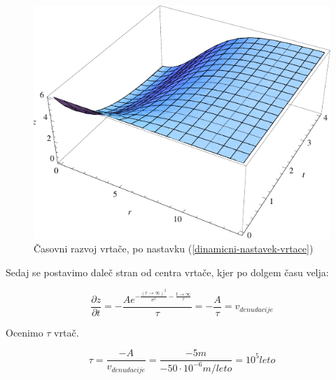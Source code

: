 \documentclass[a4paper, oneside, 12pt]{book}
\begin{document}
  \begin{figure}[H]
    \begin{center}
      \includegraphics[width=14cm]{slike/vrtaca-dinamicno}
    \end{center}
    \caption{Časovni razvoj vrtače, po nastavku (\ref{dinamicni-nastavek-vrtace})}
    \label{fig:vrtaca-dinamicno}
  \end{figure}

  Sedaj se postavimo daleč stran od centra vrtače, kjer po dolgem času velja:

  \begin{equation}
    \frac{\partial z}{\partial t} = -\frac{A e^{-\frac{(r \rightarrow \infty)^2}{\sigma ^2}-\frac{t \rightarrow \infty}{\tau }}}{\tau } = -\frac{A}{\tau} = v_{denudacije}
    \label{hitrost-denudacije}
  \end{equation}

  Ocenimo $\tau$ vrtač.

  \begin{equation}
    \tau = \frac{-A}{v_{denudacije}}=\frac{-5m}{-50\cdot 10^{-6} m/leto} = 10^5 leto
    \label{tau-vrtace}
  \end{equation}
\end{document}
